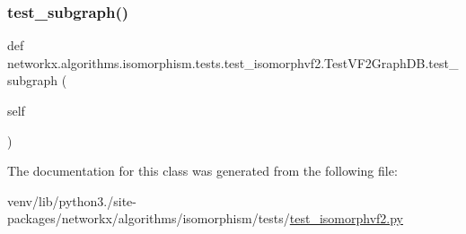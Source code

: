 \subsubsection{\texorpdfstring{test\+\_\+subgraph()}{test\_subgraph()}}
{\footnotesize\ttfamily def networkx.\+algorithms.\+isomorphism.\+tests.\+test\+\_\+isomorphvf2.\+Test\+V\+F2\+Graph\+D\+B.\+test\+\_\+subgraph (\begin{DoxyParamCaption}\item[{}]{self }\end{DoxyParamCaption})}



The documentation for this class was generated from the following file\+:\begin{DoxyCompactItemize}
\item 
venv/lib/python3./site-\/packages/networkx/algorithms/isomorphism/tests/\hyperlink{test__isomorphvf2_8py}{test\+\_\+isomorphvf2.\+py}\end{DoxyCompactItemize}
